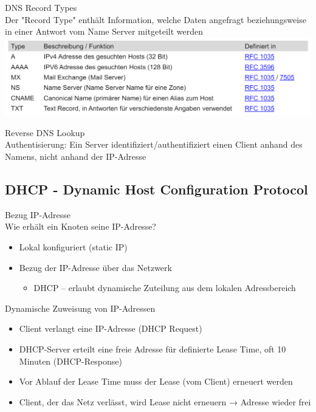 \begin{definition}{DNS Record Types}\\
    Der "Record Type" enthält Information, welche Daten angefragt beziehungsweise in einer
    Antwort vom Name Server mitgeteilt werden\\
    \includegraphics[width=1\linewidth]{images/dns_record_types.png}
\end{definition}

\begin{definition}{Reverse DNS Lookup}\\
    Authentisierung: Ein Server identifiziert/authentifiziert einen Client anhand des Namens, nicht anhand der IP-Adresse
\end{definition}

\subsection{DHCP - Dynamic Host Configuration Protocol}

\begin{definition}{Bezug IP-Adresse}\\
    Wie erhält ein Knoten seine IP-Adresse?
    \begin{itemize}
        \item Lokal konfiguriert (static IP)
        \item Bezug der IP-Adresse über das Netzwerk
        \begin{itemize}
            \item DHCP – erlaubt dynamische Zuteilung aus dem lokalen Adressbereich
        \end{itemize}
    \end{itemize}
\end{definition}

\begin{concept}{Dynamische Zuweisung von IP-Adressen}
    \begin{itemize}
        \item Client verlangt eine IP-Adresse (DHCP Request)
        \item DHCP-Server erteilt eine freie Adresse für definierte Lease Time, oft 10 Minuten (DHCP-Response)
        \item Vor Ablauf der Lease Time muss der Lease (vom Client) erneuert werden
        \item Client, der das Netz verlässt, wird Lease nicht erneuern → Adresse wieder frei
    \end{itemize}
\end{concept}

